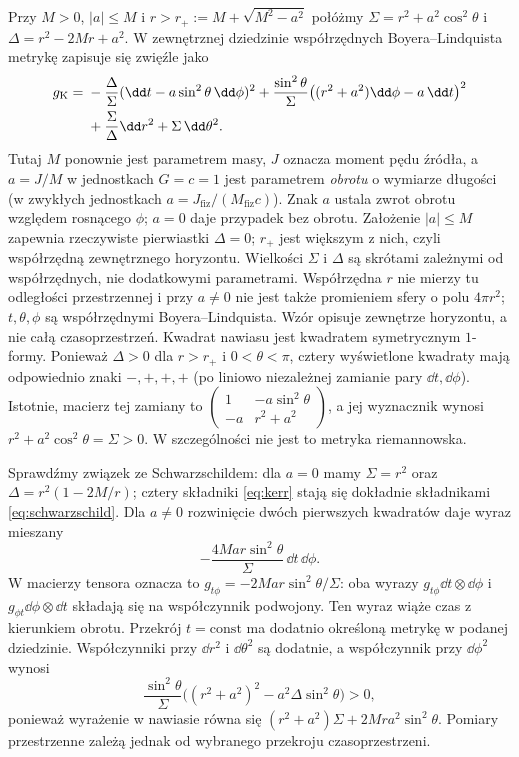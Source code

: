 \begin{przyklad}[Kerr]
\label{prz:metryka-kerr}
Przy $M>0$, $|a|\leq M$ i
$r>r_+:=M+\sqrt{M^2-a^2}$ połóżmy
$\Sigma=r^2+a^2\cos^2\theta$ i
$\Delta=r^2-2Mr+a^2$. W zewnętrznej
dziedzinie współrzędnych Boyera--Lindquista
metrykę zapisuje się zwięźle jako
\begin{align}\label{eq:kerr}
 g_{\mathrm K}
 ={}&-\frac{\Delta}{\Sigma}
       (\dd t-a\sin^2\theta\,\dd\phi)^2
  +\frac{\sin^2\theta}{\Sigma}
       \bigl((r^2+a^2)\dd\phi-a\,\dd t\bigr)^2\\
 &+\frac{\Sigma}{\Delta}\dd r^2
  +\Sigma\,\dd\theta^2.\notag
\end{align}
Tutaj $M$ ponownie jest parametrem masy,
$J$ oznacza moment pędu źródła, a
$a=J/M$ w jednostkach $G=c=1$ jest parametrem
\emph{obrotu} o wymiarze długości
(w zwykłych jednostkach $a=J_{\mathrm{fiz}}/
(M_{\mathrm{fiz}}c)$). Znak $a$ ustala zwrot
obrotu względem rosnącego $\phi$; $a=0$ daje
przypadek bez obrotu. Założenie $|a|\leq M$
zapewnia rzeczywiste pierwiastki $\Delta=0$;
$r_+$ jest większym z nich, czyli współrzędną
zewnętrznego horyzontu. Wielkości $\Sigma$ i
$\Delta$ są skrótami zależnymi od współrzędnych,
nie dodatkowymi parametrami. Współrzędna $r$
nie mierzy tu odległości przestrzennej i przy
$a\ne0$ nie jest także promieniem sfery o polu
$4\pi r^2$; $t,\theta,\phi$ są współrzędnymi
Boyera--Lindquista. Wzór opisuje zewnętrze
horyzontu, a nie całą czasoprzestrzeń.
Kwadrat nawiasu jest kwadratem symetrycznym
$1$-formy. Ponieważ $\Delta>0$ dla $r>r_+$
i $0<\theta<\pi$, cztery wyświetlone
kwadraty mają odpowiednio znaki $-,+,+,+$
(po liniowo niezależnej zamianie pary
$\dd t,\dd\phi$). Istotnie, macierz tej zamiany to
$\left(\begin{smallmatrix}1&-a\sin^2\theta\\-a&r^2+a^2\end{smallmatrix}\right)$,
a jej wyznacznik wynosi $r^2+a^2\cos^2\theta=\Sigma>0$. W szczególności nie jest
to metryka riemannowska.

Sprawdźmy związek ze Schwarzschildem:
dla $a=0$ mamy $\Sigma=r^2$ oraz
$\Delta=r^2(1-2M/r)$; cztery składniki
\eqref{eq:kerr} stają się dokładnie
składnikami \eqref{eq:schwarzschild}.
Dla $a\ne0$ rozwinięcie dwóch pierwszych
kwadratów daje wyraz mieszany
\[
 -\frac{4Mar\sin^2\theta}{\Sigma}
      \,\dd t\,\dd\phi.
\]
W macierzy tensora oznacza to
$g_{t\phi}=-2Mar\sin^2\theta/\Sigma$:
oba wyrazy $g_{t\phi}\dd t\otimes\dd\phi$
i $g_{\phi t}\dd\phi\otimes\dd t$ składają
się na współczynnik podwojony.
Ten wyraz wiąże czas z kierunkiem obrotu.
Przekrój $t=\mathrm{const}$ ma dodatnio określoną
metrykę w podanej dziedzinie. Współczynniki przy
$\dd r^2$ i $\dd\theta^2$ są dodatnie, a współczynnik
przy $\dd\phi^2$ wynosi
\[
 \frac{\sin^2\theta}{\Sigma}
 \bigl((r^2+a^2)^2-a^2\Delta\sin^2\theta\bigr)>0,
\]
ponieważ wyrażenie w nawiasie równa się
$(r^2+a^2)\Sigma+2Mr a^2\sin^2\theta$.
Pomiary przestrzenne zależą jednak od wybranego
przekroju czasoprzestrzeni.
\end{przyklad}


